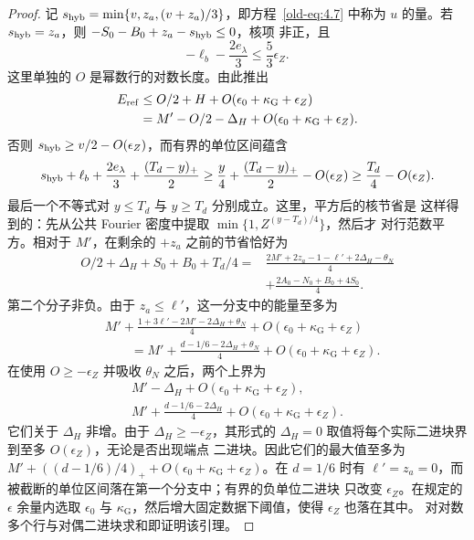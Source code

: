 \documentclass[11pt,a4paper]{article}
\numberwithin{equation}{section}
\numberwithin{figure}{section}
\theoremstyle{definition}
\theoremstyle{remark}
\begin{document}
\begin{proof}
记 $s_{\rm hyb}=\min\{v,z_a,(v+z_a)/3\}$，即方程~\eqref{old-eq:4.7} 中称为
$u$ 的量。若 $s_{\rm hyb}=z_a$，则 $-S_0-B_0+z_a-s_{\rm hyb}\le0$，核项
非正，且
\[
 -\ell_b-\frac{2e_\lambda}{3}\le\frac53\epsilon_Z.
\]
这里单独的 $O$ 是幂数行的对数长度。由此推出
\[
 \begin{aligned}
 E_{\rm ref}&\le O/2+H+O(\epsilon_0+\kappa_{\mathrm G}+\epsilon_Z)\\
 &=M'-O/2-\Delta_H+O(\epsilon_0+\kappa_{\mathrm G}+\epsilon_Z).
 \end{aligned}
\]
否则 $s_{\rm hyb}\ge v/2-O(\epsilon_Z)$，而有界的单位区间蕴含
\[
 s_{\rm hyb}+\ell_b+\frac{2e_\lambda}{3}
       +\frac{(T_d-y)_+}{2}
 \ge \frac y4+\frac{(T_d-y)_+}{2}-O(\epsilon_Z)
 \ge \frac{T_d}{4}-O(\epsilon_Z).
\]
最后一个不等式对 $y\le T_d$ 与 $y\ge T_d$ 分别成立。这里，平方后的核节省是
这样得到的：先从公共 Fourier 密度中提取 $\min\{1,Z^{(y-T_d)/4}\}$，然后才
对行范数平方。相对于 $M'$，在剩余的 $+z_a$ 之前的节省恰好为
\begin{equation}
 \begin{split}
 O/2+\Delta_H+S_0+B_0+T_d/4
 ={}&\frac{2M'+2z_a-1-\ell'+2\Delta_H-\theta_N}{4}\\
    &+\frac{2A_0-N_0+B_0+4S_0}{4}.
 \end{split}
 \label{old-eq:5.3}
\end{equation}
第二个分子非负。由于 $z_a\le\ell'$，这一分支中的能量至多为
\[
 \begin{aligned}
 &M'+\frac{1+3\ell'-2M'-2\Delta_H+\theta_N}{4}
       +O(\epsilon_0+\kappa_{\mathrm G}+\epsilon_Z)\\
 &\qquad=M'+\frac{d-1/6-2\Delta_H+\theta_N}{4}
       +O(\epsilon_0+\kappa_{\mathrm G}+\epsilon_Z).
 \end{aligned}
\]
在使用 $O\ge-\epsilon_Z$ 并吸收 $\theta_N$ 之后，两个上界为
\[
 \begin{gathered}
 M'-\Delta_H+O(\epsilon_0+\kappa_{\mathrm G}+\epsilon_Z),\\
 M'+\frac{d-1/6-2\Delta_H}{4}
       +O(\epsilon_0+\kappa_{\mathrm G}+\epsilon_Z).
 \end{gathered}
\]
它们关于 $\Delta_H$ 非增。由于 $\Delta_H\ge-\epsilon_Z$，其形式的
$\Delta_H=0$ 取值将每个实际二进块界到至多 $O(\epsilon_Z)$，无论是否出现端点
二进块。因此它们的最大值至多为
$M'+((d-1/6)/4)_++O(\epsilon_0+\kappa_{\mathrm G}+\epsilon_Z)$。在 $d=1/6$
时有 $\ell'=z_a=0$，而被截断的单位区间落在第一个分支中；有界的负单位二进块
只改变 $\epsilon_Z$。在规定的 $\epsilon$ 余量内选取 $\epsilon_0$ 与
$\kappa_{\mathrm G}$，然后增大固定数据下阈值，使得 $\epsilon_Z$ 也落在其中。
对对数多个行与对偶二进块求和即证明该引理。
\end{proof}
\end{document}
